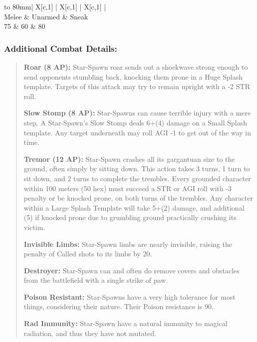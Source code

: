 \documentclass[11pt,a4paper,twocolumn]{book}
\begin{document}
	\bigskip
	{
		\begin{tabu} to 80mm{| X[c,1] | X[c,1] | X[c,1] |}
			\hline
			 \\ \hline
			Melee & Unarmed & Sneak                          \\
			75    & 60      & 80                             \\ \hline
		\end{tabu}
		
	}
	
	\subsubsection*{Additional Combat Details:}
	\begin{verse}
		\textbf{Roar (8 AP):} Star-Spawn roar sends out a shockwave strong enough to send opponents stumbling back, knocking them prone in a Huge Splash template. Targets of this attack may try to remain upright with a -2 STR roll.
		
		\textbf{Slow Stomp (8 AP):} Star-Spawns can cause terrible injury with a mere step. A Star-Spawn's Slow Stomp deals 6+(4) damage on a Small Splash template. Any target underneath may roll AGI -1 to get out of the way in time.
		
		\textbf{Tremor (12 AP):} Star-Spawn crashes all its gargantuan size to the ground, often simply by sitting down. This action takes 3 turns, 1 turn to sit down, and 2 turns to complete the trembles. Every grounded character within 100 meters (50 hex) must succeed a STR or AGI roll with -3 penalty or be knocked prone, on both turns of the trembles. Any character within a Large Splash Template will take 5+(2) damage, and additional (5) if knocked prone due to grumbling ground practically crushing its victim.
		
		\textbf{Invisible Limbs:} Star-Spawn limbs are nearly invisible, raising the penalty of Called shots to its limbs by 20.
		
		\textbf{Destroyer:} Star-Spawn can and often do remove covers and obstacles from the battlefield with a single strike of paw.
		
		\textbf{Poison Resistant:} Star-Spawns have a very high tolerance for most things, considering their nature. Their Poison resistance is 90.
		
		\textbf{Rad Immunity:} Star-Spawn have a natural immunity to magical radiation, and thus they have not mutated.
	\end{verse} 
	
\end{document}
